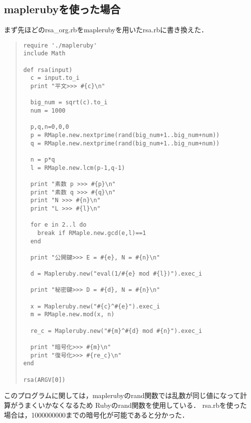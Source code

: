 \subsection{maplerubyを使った場合}
まず先ほどのrsa\_org.rbをmaplerubyを用いたrsa.rbに書き換えた．
\begin{quote}\begin{verbatim}
require './mapleruby'
include Math

def rsa(input)
  c = input.to_i
  print "平文>>> #{c}\n"
  
  big_num = sqrt(c).to_i
  num = 1000
  
  p,q,n=0,0,0
  p = RMaple.new.nextprime(rand(big_num+1..big_num+num))
  q = RMaple.new.nextprime(rand(big_num+1..big_num+num))
  
  n = p*q
  l = RMaple.new.lcm(p-1,q-1)
  
  print "素数 p >>> #{p}\n"
  print "素数 q >>> #{q}\n"
  print "N >>> #{n}\n"
  print "L >>> #{l}\n"
  
  for e in 2..l do
    break if RMaple.new.gcd(e,l)==1
  end
  
  print "公開鍵>>> E = #{e}, N = #{n}\n"
  
  d = Mapleruby.new("eval(1/#{e} mod #{l})").exec_i
  
  print "秘密鍵>>> D = #{d}, N = #{n}\n"
  
  x = Mapleruby.new("#{c}^#{e}").exec_i
  m = RMaple.new.mod(x, n)
  
  re_c = Mapleruby.new("#{m}^#{d} mod #{n}").exec_i
  
  print "暗号化>>> #{m}\n"
  print "復号化>>> #{re_c}\n"
end

rsa(ARGV[0])
\end{verbatim}\end{quote}
このプログラムに関しては，maplerubyのrand関数では乱数が同じ値になって計算がうまくいかなくなるため
Rubyのrand関数を使用している．
rsa.rbを使った場合は，1000000000までの暗号化が可能であると分かった．
